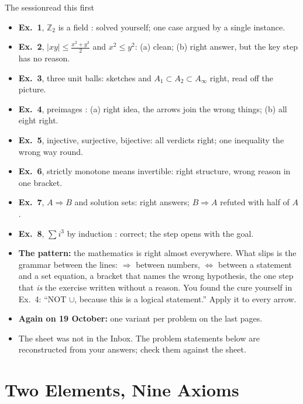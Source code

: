\documentclass{kaelearn}
\subtitle{Eight problems, one habit: every arrow joins two statements and carries the reason that makes it true.}
\begin{document}
\makeheader
{}

\begin{panel}{The session}{read this first}{}
\begin{itemize}
  \item \textbf{Ex.\ 1}, $\mathbb{Z}_2$ is a field : solved yourself; one case argued by a single instance.
  \item \textbf{Ex.\ 2}, $|xy|\le\frac{x^2+y^2}{2}$ and $x^2\le y^2$: (a) clean; (b) right answer, but the
        key step has no reason.
  \item \textbf{Ex.\ 3}, three unit balls: sketches and $A_1\subset A_2\subset A_\infty$ right, read off the picture.
  \item \textbf{Ex.\ 4}, preimages : (a) right idea, the arrows join the wrong things; (b) all eight right.
  \item \textbf{Ex.\ 5}, injective, surjective, bijective: all verdicts right; one inequality the wrong way round.
  \item \textbf{Ex.\ 6}, strictly monotone means invertible: right structure, wrong reason in one bracket.
  \item \textbf{Ex.\ 7}, $A\Rightarrow B$ and solution sets: right answers; $B\Rightarrow A$ refuted with half of $A$.
  \item \textbf{Ex.\ 8}, $\sum i^3$ by induction : correct; the step opens with the goal.
  \item \textbf{The pattern:} the mathematics is right almost everywhere. What slips is the grammar between the lines:
        $\Rightarrow$ between numbers, $\Leftrightarrow$ between a statement and a set equation, a bracket that names
        the wrong hypothesis, the one step that \emph{is} the exercise written without a reason. You found the cure
        yourself in Ex.\ 4: ``NOT $\cup$, because this is a logical statement.'' Apply it to every arrow.
  \item \textbf{Again on 19 October:} one variant per problem on the last pages.
  \item The sheet was not in the Inbox. The problem statements below are reconstructed from your answers; check them
        against the sheet.
\end{itemize}
\end{panel}

\section{Two Elements, Nine Axioms}
\end{document}
